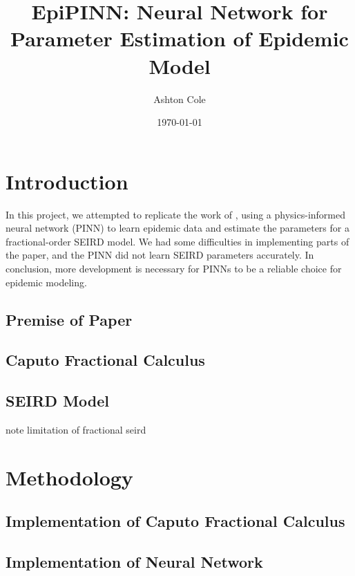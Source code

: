 \documentclass{article}
\title{EpiPINN: Neural Network for Parameter Estimation of Epidemic Model}
\author{Ashton Cole}
\date{\today}
\begin{document}
	\maketitle
	
	\section{Introduction}
	\label{section:Introduction}
	
	In this project, we attempted to replicate the work of \cite{}, using a physics-informed neural network (PINN) to learn epidemic data and estimate the parameters for a fractional-order SEIRD model. We had some difficulties in implementing parts of the paper, and the PINN did not learn SEIRD parameters accurately. In conclusion, more development is necessary for PINNs to be a reliable choice for epidemic modeling.
	
	\subsection{Premise of Paper}
	\label{subsection:Premise_of_Paper}
	
	\subsection{Caputo Fractional Calculus}
	\label{subsection:Caputo_Fractional_Calculus}
	
	\subsection{SEIRD Model}
	\label{subsection:SEIRD_Model}
	
	note limitation of fractional seird
	
	\section{Methodology}
	\label{section:Methodology}
	
	\subsection{Implementation of Caputo Fractional Calculus}
	\label{subsection:Implementation_of_Caputo_Fractional_Calculus}
	
	\subsection{Implementation of Neural Network}
	\label{subsection:Implementation_of_Neural_Network}
	
\end{document}
